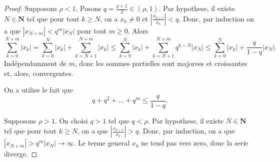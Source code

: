\begin{proof}
Supposons $\rho <1$. Posons $q=\frac{\rho +1}{2}\in (\rho,1)$. Par hypothese, il existe $N\in \mathbf{N}$ tel que pour tout $k\ge N$, on a $x_{k}\neq0$ et $\left\lvert  \frac{x_{k+1}}{x_{k}}  \right\rvert<q$. Donc, par induction on a que $|x_{N+m}|<q^{m}|x_{N}|$ pour tout $m\ge 0$. Alors
$$
\sum_{k=0}^{N+m} |x_{k}|=\sum_{k=0}^{N} |x_{k}|+\sum_{k=N+1}^{N+m}|x_{k}|\le \sum_{k=0}^{N} |x_{k}|+ \sum_{k=N+1}^{N+m}q^{k-N}|x_{N}|\le \sum_{k=0}^{N} |x_{k}|+ \frac{q}{1-q}|x_{N}|.  
$$
Indépendamment de $m$, donc les sommes partielles sont majorees et croissantes et, alors, convergentes.

On a utilise le fait que 
$$
q+q^{2}+\dots +q^{m}\le \frac{q}{1-q}.
$$

Supposons $\rho>1$. On choisi $q>1$ tel que $q<\rho$. Par hypothese, il existe $N\in \mathbf{N}$ tel que pour tout $k\ge N$, on a que $\left\lvert  \frac{x_{k+1}}{x_{k}}  \right\rvert>q$. Donc, par induction, on a que $|x_{N+m}|>q^{m}|x_{N}|\to \infty$. Le terme general $x_{k}$ ne tend pas vers zero, donc la serie diverge. 
\end{proof}
